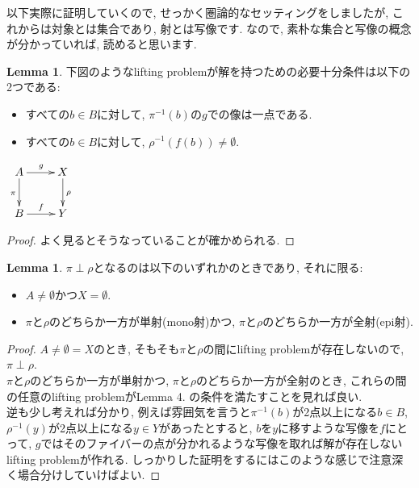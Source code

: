\documentclass[. /main]{subfiles}
\theoremstyle{definition}
\newtheorem{lemm}[theo]{Lemma}
\begin{document}
以下実際に証明していくので, せっかく圏論的なセッティングをしましたが, これからは対象とは集合であり, 射とは写像です. なので, 素朴な集合と写像の概念が分かっていれば, 読めると思います. 
\begin{lemm}
下図のようなlifting problemが解を持つための必要十分条件は以下の2つである:
\begin{itemize}
\item すべての$b \in B$に対して, ${\pi}^{-1}(b)$の$g$での像は一点である. 
\item すべての$b \in B$に対して, ${\rho}^{-1}(f(b)) \neq \emptyset$. 
\end{itemize}

\begin{center}
$\xymatrix{
A \ar[d]_{\pi} \ar[r]^g \ar@{}[dr] & X \ar[d]^{\rho} \\
B \ar[r]^f & Y \\
}$
\end{center}
\end{lemm}
\begin{proof}
よく見るとそうなっていることが確かめられる. 
\end{proof}

\begin{lemm}
$\pi \perp \rho$となるのは以下のいずれかのときであり, それに限る:
\begin{itemize}
\item $A \neq \emptyset$かつ$X=\emptyset$.
\item $\pi$と$\rho$のどちらか一方が単射(mono射)かつ, $\pi$と$\rho$のどちらか一方が全射(epi射). 
\end{itemize}
\end{lemm}
\begin{proof}
$A \neq \emptyset = X$のとき, そもそも$\pi$と$\rho$の間にlifting problemが存在しないので, $\pi \perp \rho$. \\
$\pi$と$\rho$のどちらか一方が単射かつ, $\pi$と$\rho$のどちらか一方が全射のとき, これらの間の任意のlifting problemがLemma 4. の条件を満たすことを見れば良い. \\
逆も少し考えれば分かり, 例えば雰囲気を言うと${\pi}^{-1}(b)$が2点以上になる$b \in B$, ${\rho}^{-1}(y)$が2点以上になる$y \in Y$があったとすると, $b$を$y$に移すような写像を$f$にとって, $g$ではそのファイバーの点が分かれるような写像を取れば解が存在しないlifting problemが作れる. しっかりした証明をするにはこのような感じで注意深く場合分けしていけばよい. 
\end{proof}
\end{document}
